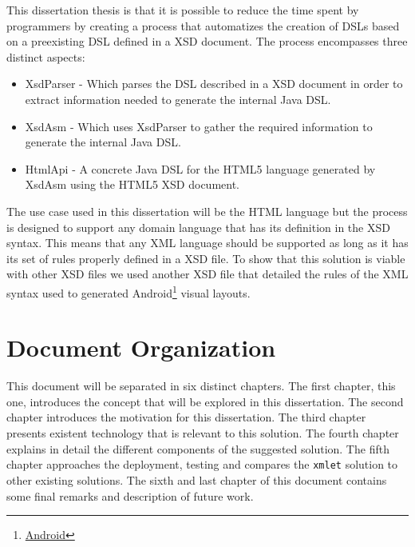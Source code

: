 This dissertation thesis is that it is possible to reduce the time spent by programmers by creating a process that automatizes the creation of \ac{DSL}s based on a preexisting \ac{DSL} defined in a \ac{XSD} document. The process encompasses three distinct aspects:

\begin{itemize}
	\item XsdParser - Which parses the \ac{DSL} described in a \ac{XSD} document in order to extract information needed to generate the internal Java \ac{DSL}.
	\item XsdAsm - Which uses XsdParser to gather the required information to generate the internal Java \ac{DSL}.
	\item HtmlApi - A concrete Java \ac{DSL} for the \ac{HTML}5 language generated by XsdAsm using the \ac{HTML}5 \ac{XSD} document.
\end{itemize}

\noindent
The use case used in this dissertation will be the \ac{HTML} language but the process is designed to support any domain language that has its definition in the \ac{XSD} syntax. This means that any \ac{XML} language should be supported as long as it has its set of rules properly defined in a \ac{XSD} file. To show that this solution is viable with other \ac{XSD} files we used another \ac{XSD} file that detailed the rules of the \ac{XML} syntax used to generated Android\footnote{\href{https://www.android.com/}{Android}} visual layouts.

\section{Document Organization}

This document will be separated in six distinct chapters. The first chapter, this one, introduces the concept that will be explored in this dissertation. The second chapter introduces the motivation for this dissertation. The third chapter presents existent technology that is relevant to this solution. The fourth chapter explains in detail the different components of the suggested solution. The fifth chapter approaches the deployment, testing and compares the \texttt{xmlet} solution to other existing solutions. The sixth and last chapter of this document contains some final remarks and description of future work.
